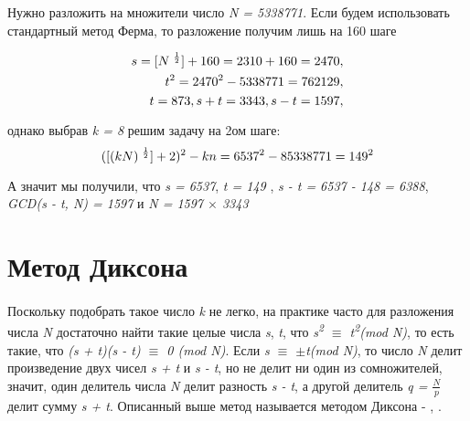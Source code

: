   \begin{example}
    Нужно разложить на множители число \textit{N = 5338771}. Если будем использовать стандартный метод Ферма, то разложение получим лишь на 160 шаге
    
      \begin{subequations}
	\begin{align}
	  s = [N\textsuperscript{ {$\frac{1}{2}$}}] + 160 = 2310 + 160 = 2470, \\
	  t\textsuperscript{2} = 2470\textsuperscript{2} - 5338771 = 762129, \\
	  t = 873, s + t = 3343, s - t = 1597, 
       \end{align}
      \end{subequations}	
    
    однако выбрав \textit{k = 8} решим задачу на 2ом шаге: 
      \begin{equation}
       ([(kN)\textsuperscript{ {$\frac{1}{2}$}}] + 2)\textsuperscript{2} - k n = 6537\textsuperscript{2} - 8 5338771 = 149\textsuperscript{2}
      \end{equation}	
	
    А значит мы получили, что \textit{s = 6537}, \textit{t = 149} , \textit{s - t = 6537 - 148 = 6388}, \textit{GCD(s - t, N) = 1597} и \textit{N = 1597 {$\times$} 3343}
  \end{example}


\section{Метод Диксона}

\paragraph{} Поскольку подобрать такое число \textit{k} не легко, на практике часто для разложения числа \textit{N} достаточно найти такие целые числа \textit{s},
\textit{t}, что \textit{s\textsuperscript{2} {$\equiv$} t\textsuperscript{2}(mod N)}, то есть такие, что \textit{(s + t)(s - t) {$\equiv$} 0 (mod N)}. 
Если \textit{s {$\equiv$} {$\pm$}t(mod N)}, то число \textit{N} делит произведение двух чисел \textit{s + t} и \textit{s - t}, но не делит ни один 
из сомножителей, значит, один делитель числа \textit{N} делит разность \textit{s - t}, а другой делитель \textit{q = {$\frac{N}{p}$}} делит сумму \textit{s + t}.
Описанный выше метод называется методом Диксона - \cite[Глава 4.1, страницы 115-117]{ish11}, \cite[Глава 6.4, страницы 218-219]{mah06}.

